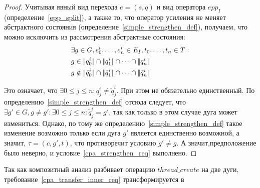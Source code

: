 \begin{itemize}
\begin{proof}
Учитывая явный вид перехода $e=(s,q)$ и вид оператора $epp_I$(определение~\ref{epp_split}), а также то, что оператор усиления не меняет абстрактного состояния (определение~\ref{simple_strengthen_def}), получаем, что можно исключить из рассмотрения абстрактные состояния:
\begin{align*}
& \exists g \in G, e^i_0, \dots, e^i_n \in E_I, t_0, \dots, t_n \in T : \\
& g \in \econc{q^i_0} \cap \econc{q^i_1} \cap \dots \cap \econc{q^i_n} \\
& g \notin \econc{\tilde{q}^i_0} \cap \econc{\tilde{q}^i_1} \cap \dots \cap \econc{\tilde{q}^i_n} 
\end{align*}

Это означает, что $\exists 0 \le j \le n: q^i_j \neq \tilde{q}^i_j$. При этом не обязательно единственный.
По определению~\ref{simple_strengthen_def} отсюда следует, что $\exists g' \in G, g \neq g': \exists 0 \le j \le n: \tilde{q}^i_j = g'$, так как только в этом случае дуга может измениться.
Однако, по тому же определению~\ref{simple_strengthen_def} такое изменение возможно только если дуга $g'$ является единственно возможной, а значит, $\tau = (c, g', t)$, что противоречит условию $g' \neq g$. 
А значит,предположение было неверно, и условие~\ref{cpa_strengthen_req} выполнено.
\end{proof}

Так как композитный анализ разбивает операцию $thread\_create$ на две дуги, требование~\ref{cpa_transfer_inner_req} трансформируется в


\end{itemize}
